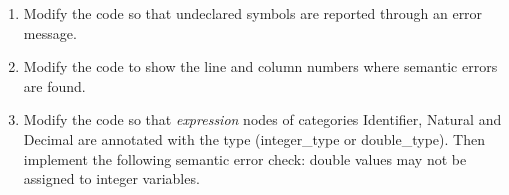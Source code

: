 \begin{enumerate}
\item Modify the code so that undeclared symbols are reported through an error message.
\item Modify the code to show the line and column numbers where semantic errors are found.
\item Modify the code so that \textit{expression} nodes of categories Identifier, Natural and Decimal are annotated with the type (integer\_type or double\_type). Then implement the following semantic error check: double values may not be assigned to integer variables.
\end{enumerate}